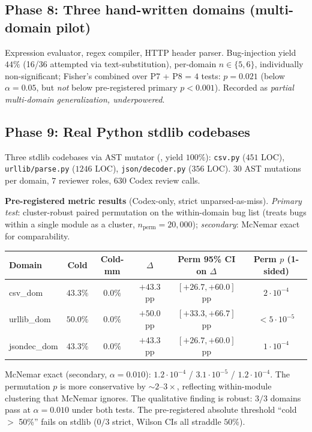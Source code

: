 \subsection{Phase 8: Three hand-written domains (multi-domain pilot)}
\label{sec:phase8}

Expression evaluator, regex compiler, HTTP header parser. Bug-injection yield $44\%$ (16/36 attempted via text-substitution), per-domain $n \in \{5, 6\}$, individually non-significant; Fisher's combined over P7 + P8 = $4$ tests: $p = 0.021$ (below $\alpha = 0.05$, but \emph{not} below pre-registered primary $p < 0.001$). Recorded as \emph{partial multi-domain generalization, underpowered}.

\subsection{Phase 9: Real Python stdlib codebases}
\label{sec:phase9}

Three stdlib codebases via AST mutator (, yield $100\%$): \texttt{csv.py} ($451$ LOC), \texttt{urllib/parse.py} ($1246$ LOC), \texttt{json/decoder.py} ($356$ LOC). $30$ AST mutations per domain, $7$ reviewer roles, $630$ Codex review calls.

\textbf{Pre-registered metric results} (Codex-only, strict unparsed-as-miss). \emph{Primary test}: cluster-robust paired permutation on the within-domain bug list (treats bugs within a single module as a cluster, $n_{\text{perm}} = 20{,}000$); \emph{secondary}: McNemar exact for comparability.

\begin{center}
\small
\begin{tabular}{@{}lccccc@{}}
\toprule
Domain & Cold & Cold-mm & $\Delta$ & Perm 95\% CI on $\Delta$ & Perm $p$ (1-sided) \\
\midrule
csv\_dom & $43.3\%$ & $0.0\%$ & $+43.3$ pp & $[+26.7, +60.0]$ pp & $2 \cdot 10^{-4}$ \\
urllib\_dom & $50.0\%$ & $0.0\%$ & $+50.0$ pp & $[+33.3, +66.7]$ pp & $< 5\cdot 10^{-5}$ \\
jsondec\_dom & $43.3\%$ & $0.0\%$ & $+43.3$ pp & $[+26.7, +60.0]$ pp & $1 \cdot 10^{-4}$ \\
\bottomrule
\end{tabular}
\end{center}

McNemar exact (secondary, $\alpha = 0.010$): $1.2\cdot 10^{-4}$ / $3.1\cdot 10^{-5}$ / $1.2\cdot 10^{-4}$. The permutation $p$ is more conservative by $\sim 2$--$3\times$, reflecting within-module clustering that McNemar ignores. The qualitative finding is robust: $3/3$ domains pass at $\alpha = 0.010$ under both tests. The pre-registered absolute threshold ``cold $>$ 50\%'' fails on stdlib ($0/3$ strict, Wilson CIs all straddle $50\%$).

